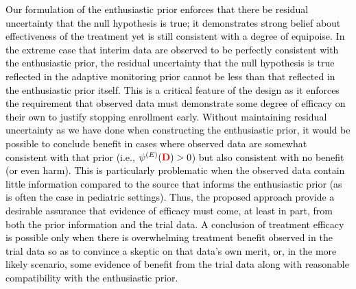 \documentclass[12pt]{article}
\begin{document}
\textcolor{black}{Our formulation of the enthusiastic prior enforces that there be residual uncertainty that the null hypothesis is true; it demonstrates strong belief about effectiveness of the treatment yet is still consistent with a degree of equipoise. In the extreme case that interim data are observed to be perfectly consistent with the enthusiastic prior, the residual uncertainty that the null hypothesis is true reflected in the adaptive monitoring prior cannot be less than that reflected in the enthusiastic prior itself. This is a critical feature of the design as it enforces the requirement that observed data must demonstrate some degree of efficacy on their own to justify stopping enrollment early. Without maintaining residual uncertainty as we have done when constructing the enthusiastic prior, it would be possible to conclude benefit in cases where observed data are somewhat consistent with that prior (i.e., $\psi^{(E)}(\textcolor{red}{\mathbf{D}}) > 0$) but also consistent with no benefit (or even harm). This is particularly problematic when the observed data contain little information compared to the source that informs the enthusiastic prior (as is often the case in pediatric settings). Thus, the proposed approach provide a desirable assurance that evidence of efficacy must come, at least in part, from both the prior information and the trial data. A conclusion of treatment efficacy is possible only when there is overwhelming treatment benefit observed in the trial data so as to convince a skeptic on that data's own merit, or, in the more likely scenario, some evidence of benefit from the trial data along with reasonable compatibility with the enthusiastic prior.}
\end{document}
